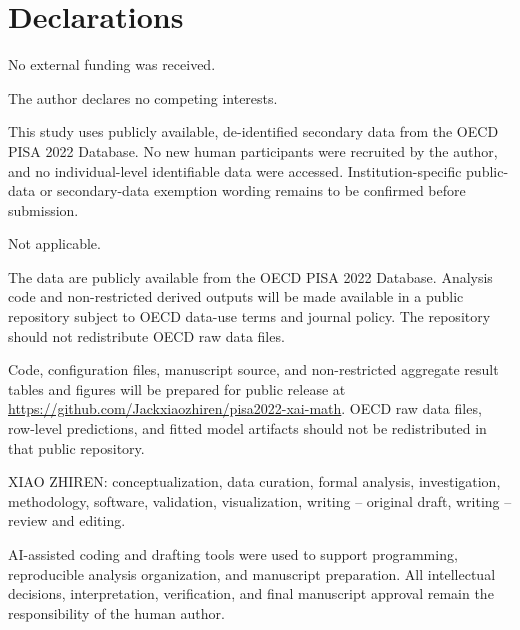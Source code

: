 \documentclass[pdflatex,sn-mathphys-ay]{sn-jnl}
\begin{document}












\clearpage



\backmatter

\section*{Declarations}

No external funding was received.

The author declares no competing interests.

This study uses publicly available, de-identified secondary data from the OECD PISA 2022 Database. No new human participants were recruited by the author, and no individual-level identifiable data were accessed. Institution-specific public-data or secondary-data exemption wording remains to be confirmed before submission.

Not applicable.

The data are publicly available from the OECD PISA 2022 Database. Analysis code and non-restricted derived outputs will be made available in a public repository subject to OECD data-use terms and journal policy. The repository should not redistribute OECD raw data files.

Code, configuration files, manuscript source, and non-restricted aggregate result tables and figures will be prepared for public release at \url{https://github.com/Jackxiaozhiren/pisa2022-xai-math}. OECD raw data files, row-level predictions, and fitted model artifacts should not be redistributed in that public repository.

XIAO ZHIREN: conceptualization, data curation, formal analysis, investigation, methodology, software, validation, visualization, writing -- original draft, writing -- review and editing.

AI-assisted coding and drafting tools were used to support programming, reproducible analysis organization, and manuscript preparation. All intellectual decisions, interpretation, verification, and final manuscript approval remain the responsibility of the human author.


\end{document}
